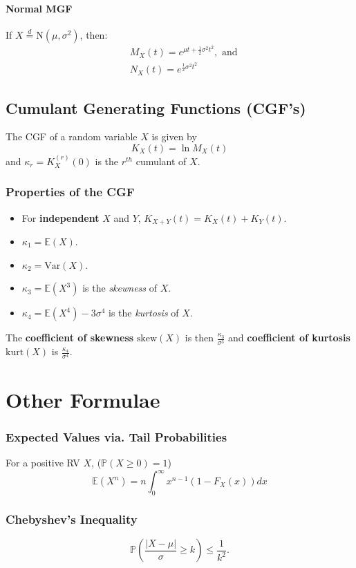 \documentclass[titlepage,twocolumn]{article}
\begin{document}
\paragraph{Normal MGF}
If $X\stackrel{d}{=}\mbox{N}(\mu, \sigma^2)$, then:
\begin{align*}
    &M_X(t) = e^{\mu t + \frac{1}{2}\sigma^2t^2},\mbox{ and}\\
    &N_X(t) = e^{\frac{1}{2}\sigma^2t^2}
\end{align*}

\subsection*{Cumulant Generating Functions (CGF's)}
The CGF of a random variable $X$ is given by $$K_X(t) = \ln M_X(t)$$ and $\kappa_r = K_X^{(r)}(0)$ is the $r^{th}$ cumulant of $X$.
\subsubsection*{Properties of the CGF}
\begin{itemize}
    \item For \textbf{independent} $X$ and $Y$, $K_{X+Y}(t)=K_{X}(t)+K_{Y}(t)$.
    \item $\kappa_1 = \mathbb{E}(X)$.
    \item $\kappa_2 = \mbox{Var}(X)$.
    \item $\kappa_3 = \mathbb{E}(X^3)$ is the \textit{skewness} of $X$.
    \item $\kappa_4 = \mathbb{E}(X^4) - 3\sigma^4$ is the \textit{kurtosis} of $X$.
\end{itemize}
The \textbf{coefficient of skewness} $\mbox{skew}(X)$ is then $\frac{\kappa_3}{\sigma^3}$ and \textbf{coefficient of kurtosis} $\mbox{kurt}(X)$ is $\frac{\kappa_4}{\sigma^4}$.

\section*{Other Formulae}
\subsubsection*{Expected Values via. Tail Probabilities}
For a positive RV $X$, ($\mathbb{P}(X\geq 0) = 1$)$$\mathbb{E}(X^n) = n \int_0^{\infty}x^{n-1}(1-F_X(x))dx$$
\subsubsection*{Chebyshev's Inequality}
$$\mathbb{P}\left(\frac{|X-\mu|}{\sigma} \geq k\right) \leq \frac{1}{k^2}.$$
\end{document}
